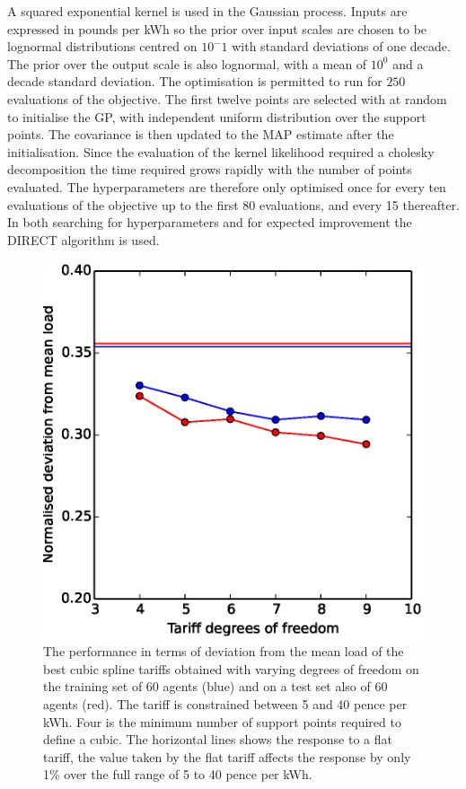 \documentclass[a4paper, 10 pt, conference]{ieeeconf}  %
\begin{document}
A squared exponential kernel is used in the Gaussian process. Inputs are expressed in pounds per kWh so the  prior over input scales are chosen to be lognormal distributions centred on $10^-1$ with standard deviations of one decade. The prior over the output scale is also lognormal, with a mean of $10^0$ and a decade standard deviation. The optimisation is permitted to run for $250$ evaluations of the objective. The first twelve points are selected with at random to initialise the GP, with independent uniform distribution over the support points. The covariance is then updated to the MAP estimate after the initialisation. Since the evaluation of the kernel likelihood required a cholesky decomposition the time required grows rapidly with the number of points evaluated. The hyperparameters are therefore only optimised once for every ten evaluations of the objective up to the first 80 evaluations, and every 15 thereafter. In both searching for hyperparameters and for expected improvement the DIRECT algorithm is used.

\begin{figure}[htb]
\centering
\includegraphics[width=\columnwidth,trim =0cm 0cm 0cm 0cm,clip=True]{f2.eps}
\caption{The performance in terms of deviation from the mean load of the best cubic spline tariffs obtained with varying degrees of freedom on the training set of 60 agents (blue) and on a test set also of 60 agents (red). The tariff is constrained between 5 and 40 pence per kWh. Four is the minimum number of support points required to define a cubic. The horizontal lines shows the response to a flat tariff, the value taken by the flat tariff affects the response by only 1\% over the full range of 5 to 40 pence per kWh.}
\label{DOFplot}
\end{figure}
\end{document}
